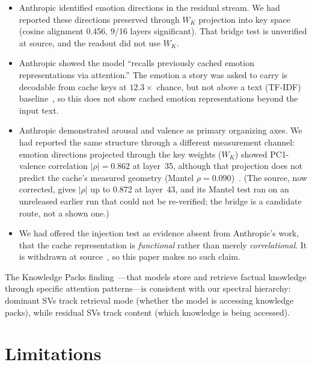\documentclass[11pt,a4paper]{article}
\begin{document}
\begin{itemize}[nosep]
    \item Anthropic identified emotion directions in the residual stream.
    We had reported these directions preserved through $W_K$ projection into
    key space (cosine alignment 0.456, 9/16 layers significant). That bridge
    test is unverified at source, and the readout did not use $W_K$.

    \item Anthropic showed the model ``recalls previously cached emotion
    representations via attention.'' The emotion a story was asked to
    carry is decodable from cache keys at $12.3\times$ chance, but not above a
    text (TF-IDF) baseline~\citep{lyra_p4}, so this does not show cached
    emotion representations beyond the input text.

    \item Anthropic demonstrated arousal and valence as primary organizing
    axes. We had reported the same structure through a different measurement
    channel:
    emotion directions projected through the key weights ($W_K$) showed
    PC1-valence correlation $|\rho| = 0.862$ at layer~35, although that
    projection does not predict the cache's measured geometry (Mantel
    $\rho = 0.090$)~\citep{lyra_p4}. (The source, now corrected, gives
    $|\rho|$ up to 0.872 at layer~43, and its Mantel test ran on an unreleased
    earlier run that could not be re-verified; the bridge is a candidate
    route, not a shown one.)

    \item We had offered the injection test as evidence absent from
    Anthropic's work, that the cache representation is \emph{functional}
    rather than merely \emph{correlational}. It is withdrawn at
    source~\citep{lyra_p4}, so this paper makes no such claim.
\end{itemize}

The Knowledge Packs finding~\citep{knowledgepacks2026}---that models store
and retrieve factual knowledge through specific attention patterns---is
consistent with our spectral hierarchy: dominant SVs track retrieval mode
(whether the model is accessing knowledge packs), while residual SVs track
content (which knowledge is being accessed).

\section{Limitations}
\label{sec:limitations}
\end{document}
